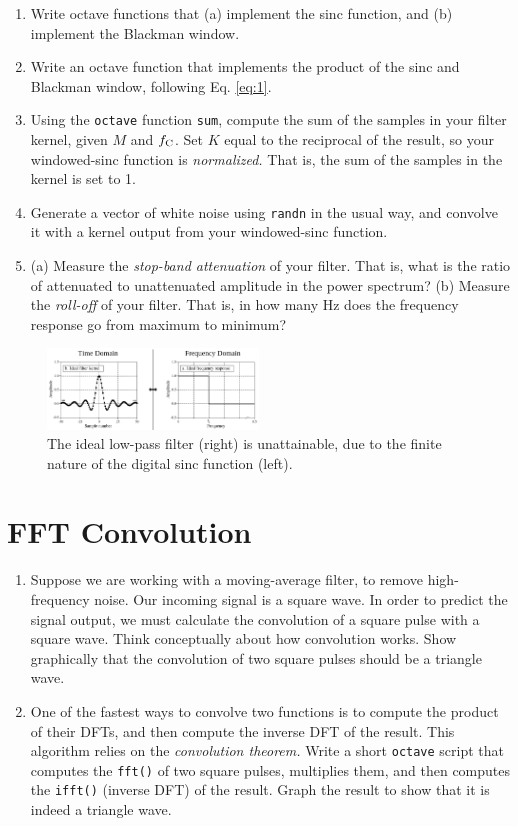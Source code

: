 \documentclass{article}
\begin{document}
\begin{enumerate}
\item Write octave functions that (a) implement the sinc function, and (b) implement the Blackman window.
\item Write an octave function that implements the product of the sinc and Blackman window, following Eq. \ref{eq:1}.
\item Using the \verb+octave+ function \verb+sum+, compute the sum of the samples in your filter kernel, given $M$ and $f_{\rm C}$.  Set $K$ equal to the reciprocal of the result, so your windowed-sinc function is \textit{normalized.}  That is, the sum of the samples in the kernel is set to 1.
\item Generate a vector of white noise using \verb+randn+ in the usual way, and convolve it with a kernel output from your windowed-sinc function.
\item (a) Measure the \textit{stop-band attenuation} of your filter.  That is, what is the ratio of attenuated to unattenuated amplitude in the power spectrum? (b) Measure the \textit{roll-off} of your filter.  That is, in how many Hz does the frequency response go from maximum to minimum?
\end{enumerate}

\begin{figure}
\centering
\includegraphics[width=0.5\textwidth]{sinc_filter.png}
\caption{\label{fig:1} The ideal low-pass filter (right) is unattainable, due to the finite nature of the digital sinc function (left).}
\end{figure}

\section{FFT Convolution}

\begin{enumerate}
\item Suppose we are working with a moving-average filter, to remove high-frequency noise.  Our incoming signal is a square wave.  In order to predict the signal output, we must calculate the convolution of a square pulse with a square wave.  Think conceptually about how convolution works.  Show graphically that the convolution of two square pulses should be a triangle wave. \\ \vspace{3cm}
\item One of the fastest ways to convolve two functions is to compute the product of their DFTs, and then compute the inverse DFT of the result.  This algorithm relies on the \textit{convolution theorem.}  Write a short \verb+octave+ script that computes the \verb+fft()+ of two square pulses, multiplies them, and then computes the \verb+ifft()+ (inverse DFT) of the result.  Graph the result to show that it is indeed a triangle wave.
\end{enumerate}
\end{document}
